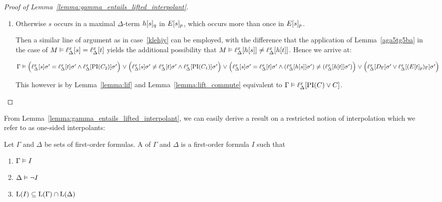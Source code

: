 \begin{proof}[Proof of Lemma~\ref{lemma:gamma_entails_lifted_interpolant}]
\begin{description}
\begin{enumerate}
				\item Otherwise $s$ occurs in a maximal $\Delta$-term $h{[s]_{q}}$ in $E{[s]_{p}}$, which occurs more than once in $E{[s]_{p}}$.

					Then a similar line of argument as in case~\ref{klehjy} can be employed, with the difference that the application of Lemma~\ref{aga5tg5ba} in the case of $M\vDash \ell_{\Delta}^{x}[s] = \ell_{\Delta}^{x}[t]$ yields the additional possibility that 
					$M\vDash \ell_{\Delta}^{x}[h[s]] \neq \ell_{\Delta}^{x}[h[t]]$.
					Hence we arrive at:

					$\Gamma \vDash
					\Big(\ell_{\Delta}^{x}[s]\sigma'=\ell_{\Delta}^{x}[t]\sigma' \land \ell_{\Delta}^{x}[\operatorname{PI}(C_2)]\sigma'\Big) \;{\lor}\;\allowbreak
					\Big(\ell_{\Delta}^{x}[s]\sigma'\neq\ell_{\Delta}^{x}[t]\sigma' \land \ell_{\Delta}^{x}[\operatorname{PI}(C_1)]\sigma'\Big) \;{\lor}\;\allowbreak
					\Big(\ell_{\Delta}^{x}[s]\sigma'=\ell_{\Delta}^{x}[t]\sigma' \land (\ell_{\Delta}^{x}[h[s]]\sigma') \neq (\ell_{\Delta}^{x}[h[t]]\sigma' )\Big) \;{\lor}\;\allowbreak
					\Big(\ell_{\Delta}^{x}[D_\Gamma]\sigma' \lor \ell_{\Delta}^{x}[(E{[t]_{p}})_\Gamma]\sigma'\Big)$

					This however is by Lemma~\ref{lemma:lif} and Lemma~\ref{lemma:lift_commute} equivalent to $\Gamma \entails \lifdelta{\PI(C) \lor\nolinebreak C}$.
					\qedhere
			\end{enumerate}
	\end{description}
\end{proof}


From Lemma~\ref{lemma:gamma_entails_lifted_interpolant}, we can easily derive a result on a restricted notion of interpolation which we refer to as one-sided interpolants:

\begin{defi}
	Let $\Gamma$ and $\Delta$ be sets of first-order formulas.
	A  of $\Gamma$ and $\Delta$ is a first-order formula $I$ such that
	\begin{enumerate}
		\item $\Gamma \vDash I$
		\item $\Delta \vDash \lnot I$
		\item $\operatorname{L}(I) \subseteq \operatorname{L}(\Gamma) \cap \operatorname{L}(\Delta)$
			\qedhere
	\end{enumerate}
\end{defi}


